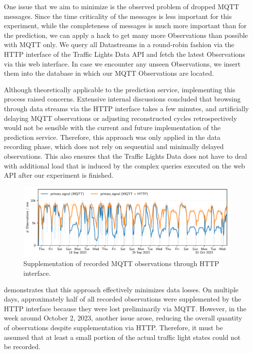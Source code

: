 One issue that we aim to minimize is the observed problem of dropped MQTT messages. Since the time criticality of the messages is less important for this experiment, while the completeness of messages is much more important than for the prediction, we can apply a hack to get many more Observations than possible with MQTT only. We query all Datastreams in a round-robin fashion via the HTTP interface of the Traffic Lights Data API and fetch the latest Observations via this web interface. In case we encounter any unseen Observations, we insert them into the database in which our MQTT Observations are located. 

Although theoretically applicable to the prediction service, implementing this process raised concerns. Extensive internal discussions concluded that browsing through data streams via the HTTP interface takes a few minutes, and artificially delaying MQTT observations or adjusting reconstructed cycles retrospectively would not be sensible with the current and future implementation of the prediction service. Therefore, this approach was only applied in the data recording phase, which does not rely on sequential and minimally delayed observations. This also ensures that the Traffic Lights Data does not have to deal with additional load that is induced by the complex queries executed on the web API after our experiment is finished.

\begin{figure}[t]
    \centering
    \includegraphics[width=\linewidth]{images/adaptiveness-mqtt-http.pdf}
    \caption{Supplementation of recorded MQTT observations through HTTP interface.}\label{fig:adaptiveness-mqtt-http}
\end{figure}

 demonstrates that this approach effectively minimizes data losses. On multiple days, approximately half of all recorded observations were supplemented by the HTTP interface because they were lost preliminarily via MQTT. However, in the week around October 2, 2023, another issue arose, reducing the overall quantity of observations despite supplementation via HTTP. Therefore, it must be assumed that at least a small portion of the actual traffic light states could not be recorded.

